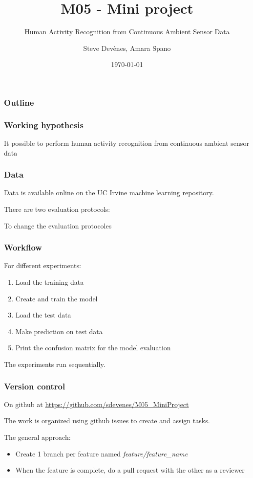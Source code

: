 \documentclass{beamer}
\title{M05 - Mini project}
\subtitle{Human Activity Recognition from Continuous Ambient Sensor Data}
\author{Steve Devènes, Amara Spano}
\institute{Unidistance}
\date{\today}
\begin{document}
	
	\begin{frame}
		\titlepage
	\end{frame}
	
	\begin{frame}
		\frametitle{Outline}
		\tableofcontents
	\end{frame}


	\begin{frame}
		\frametitle{Working hypothesis}
		It possible to perform human activity recognition from continuous ambient sensor data
	\end{frame}

	\begin{frame}
		\frametitle{Data}
		Data is available online on the UC Irvine machine learning repository.
		
		There are two evaluation protocols:
		\begin{figure}
			\centering
		\end{figure}
	
		To change the evaluation protocoles
	\end{frame}

	\begin{frame}
		\frametitle{Workflow}
		For different experiments:
		\begin{enumerate}
			\item Load the training data
			\item Create and train the model
			\item Load the test data
			\item Make prediction on test data
			\item Print the confusion matrix for the model evaluation
		\end{enumerate}
	
		The experiments run sequentially.
	\end{frame}

	\begin{frame}
		\frametitle{Version control}
		On github at \url{https://github.com/sdevenes/M05_MiniProject}
		
		The work is organized using github issues to create and assign tasks.
		
		The general approach:
		\begin{itemize}
			\item Create 1 branch per feature named \textit{feature/feature\_name}
			\item When the feature is complete, do a pull request with the other as a reviewer
		\end{itemize}
	\end{frame}
\end{document}
